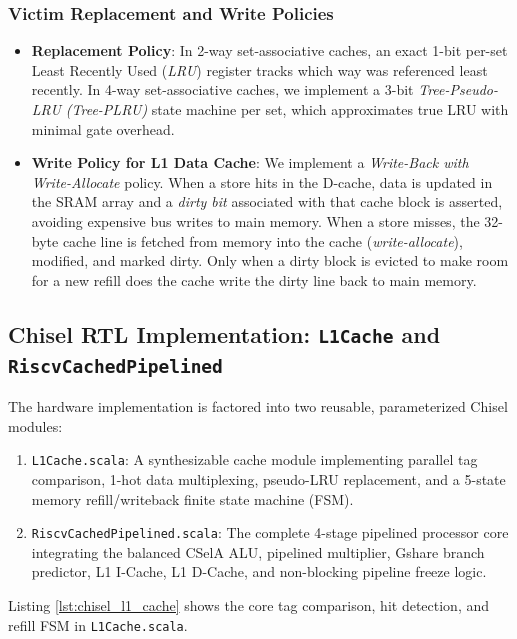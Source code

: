 \subsubsection{Victim Replacement and Write Policies}
\begin{itemize}
    \item \textbf{Replacement Policy}: In 2-way set-associative caches, an exact 1-bit per-set Least Recently Used (\textit{LRU}) register tracks which way was referenced least recently. In 4-way set-associative caches, we implement a 3-bit \textit{Tree-Pseudo-LRU (Tree-PLRU)} state machine per set, which approximates true LRU with minimal gate overhead.
    \item \textbf{Write Policy for L1 Data Cache}: We implement a \textit{Write-Back with Write-Allocate} policy. When a store hits in the D-cache, data is updated in the SRAM array and a \textit{dirty bit} associated with that cache block is asserted, avoiding expensive bus writes to main memory. When a store misses, the 32-byte cache line is fetched from memory into the cache (\textit{write-allocate}), modified, and marked dirty. Only when a dirty block is evicted to make room for a new refill does the cache write the dirty line back to main memory.
\end{itemize}

\subsection{Chisel RTL Implementation: \texttt{L1Cache} and \texttt{RiscvCachedPipelined}}

The hardware implementation is factored into two reusable, parameterized Chisel modules:
\begin{enumerate}
    \item \texttt{L1Cache.scala}: A synthesizable cache module implementing parallel tag comparison, 1-hot data multiplexing, pseudo-LRU replacement, and a 5-state memory refill/writeback finite state machine (FSM).
    \item \texttt{RiscvCachedPipelined.scala}: The complete 4-stage pipelined processor core integrating the balanced CSelA ALU, pipelined multiplier, Gshare branch predictor, L1 I-Cache, L1 D-Cache, and non-blocking pipeline freeze logic.
\end{enumerate}

Listing \ref{lst:chisel_l1_cache} shows the core tag comparison, hit detection, and refill FSM in \texttt{L1Cache.scala}.

